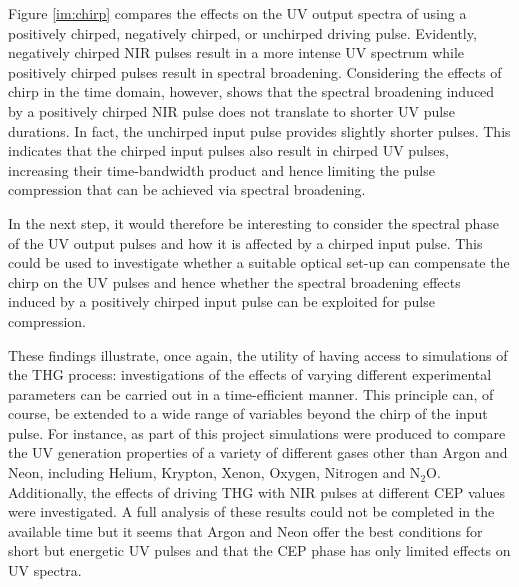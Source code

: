 \documentclass[a4paper]{jpconf}
\begin{document}
Figure \ref{im:chirp} compares the effects on the UV output spectra of using a positively chirped, negatively chirped, or unchirped driving pulse. Evidently,  negatively chirped NIR pulses result in a more intense UV spectrum while positively chirped pulses result in spectral broadening. Considering the effects of chirp in the time domain, however, shows that the spectral broadening induced by a positively chirped NIR pulse does not translate to shorter UV pulse durations. In fact, the unchirped input pulse provides slightly shorter pulses. This indicates that the chirped input pulses also result in chirped UV pulses, increasing their time-bandwidth product and hence limiting the pulse compression that can be achieved via spectral broadening. \par 
In the next step, it would therefore be interesting to consider the spectral phase of the UV output pulses and how it is affected by a chirped input pulse. This could be used to investigate whether a suitable optical set-up can compensate the chirp on the UV pulses and hence whether the spectral broadening effects  induced by a positively chirped input pulse can be exploited for pulse compression. \par 
These findings illustrate, once again, the utility of having access to simulations of the THG process:   
investigations of the effects of varying different experimental parameters can be carried out in a time-efficient manner. This principle can, of course, be extended to a wide range of variables beyond the chirp of the input pulse. For instance, as part of this project simulations were produced to compare the UV generation properties of a variety of different gases other than Argon and Neon, including Helium, Krypton, Xenon, Oxygen, Nitrogen and N$_2$O. Additionally, the effects of driving THG with NIR pulses at different CEP values were investigated. A full analysis of these results could not be completed in the available time but it seems that Argon and Neon offer the best conditions for short but energetic UV pulses and that the CEP phase has only limited effects on UV spectra. 
\end{document}

